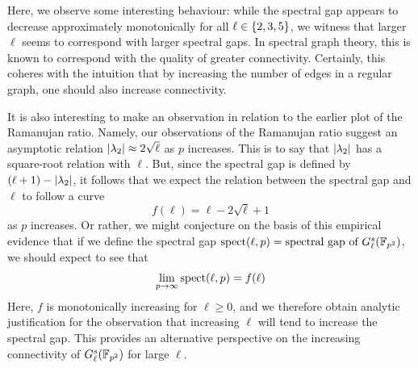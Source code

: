         Here, we observe some interesting behaviour: while the spectral gap appears to decrease approximately monotonically for all $\ell \in \left\{2,3,5\right\}$, we witness that larger $\ell$ seems to correspond with larger spectral gaps. In spectral graph theory, this is known to correspond with the quality of greater connectivity. Certainly, this coheres with the intuition that by increasing the number of edges in a regular graph, one should also increase connectivity. 

        It is also interesting to make an observation in relation to the earlier plot of the Ramanujan ratio. Namely, our observations of the Ramanujan ratio suggest an asymptotic relation $\left\lvert\lambda_2\right\rvert \approx 2\sqrt{\ell}$ as $p$ increases. This is to say that $\left\lvert\lambda_2\right\rvert$ has a square-root relation with $\ell$. But, since the spectral gap is defined by $(\ell+1) - \left\lvert\lambda_2\right\rvert$, it follows that we expect the relation between the spectral gap and $\ell$ to follow a curve
        \begin{equation*}
            f(\ell) = \ell - 2\sqrt{\ell} + 1
        \end{equation*}
        as $p$ increases. Or rather, we might conjecture on the basis of this empirical evidence that if we define the spectral gap $\operatorname{spect}(\ell,p) = \text{spectral gap of } G_\ell^s(\mathbb{F}_{p^2})$, we should expect to see that
        \begin{equation*}
            \lim_{p \to \infty} \operatorname{spect}(\ell,p) = f(\ell)
        \end{equation*}
        Here, $f$ is monotonically increasing for $\ell \geq 0$, and we therefore obtain analytic justification for the observation that increasing $\ell$ will tend to increase the spectral gap. This provides an alternative perspective on the increasing connectivity of $G_\ell^s(\mathbb{F}_{p^2})$ for large $\ell$.

